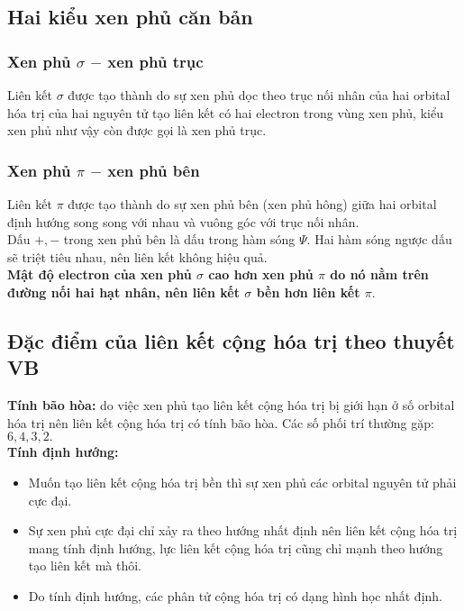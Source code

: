 \subsection{Hai kiểu xen phủ căn bản}
\subsubsection{Xen phủ $\sigma$ $-$ xen phủ trục}
Liên kết $\sigma$ được tạo thành do sự xen phủ dọc theo trục nối nhân của hai orbital hóa trị của hai nguyên tử tạo liên kết có hai electron trong vùng xen phủ, kiểu xen phủ như vậy còn được gọi là xen phủ trục.
\subsubsection{Xen phủ $\pi$ $-$ xen phủ bên}
Liên kết $\pi$ được tạo thành do sự xen phủ bên (xen phủ hông) giữa hai orbital định hướng song song với nhau và vuông góc với trục nối nhân.\\
Dấu $+, -$ trong xen phủ bên là dấu trong hàm sóng $\Psi.$ Hai hàm sóng ngược dấu sẽ triệt tiêu nhau, nên liên kết không hiệu quả.\\
\textbf{Mật độ electron của xen phủ $\sigma$ cao hơn xen phủ $\pi$ do nó nằm trên đường nối hai hạt nhân, nên liên kết $\sigma$ bền hơn liên kết $\pi.$}
\subsection{Đặc điểm của liên kết cộng hóa trị theo thuyết VB}
\textbf{Tính bão hòa:} do việc xen phủ tạo liên kết cộng hóa trị bị giới hạn ở số orbital hóa trị nên liên kết cộng hóa trị có tính bão hòa. Các số phối trí thường gặp: $6, 4, 3, 2.$\\
\textbf{Tính định hướng:}
\begin{itemize}
\item Muốn tạo liên kết cộng hóa trị bền thì sự xen phủ các orbital nguyên tử phải cực đại.
\item Sự xen phủ cực đại chỉ xảy ra theo hướng nhất định nên liên kết cộng hóa trị mang tính định hướng, lực liên kết cộng hóa trị cũng chỉ mạnh theo hướng tạo liên kết mà thôi.
\item Do tính định hướng, các phân tử cộng hóa trị có dạng hình học nhất định.
\end{itemize}
